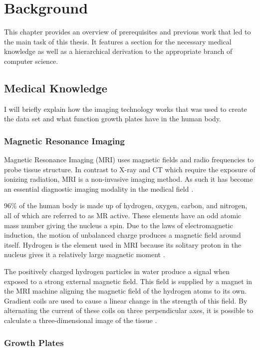 \section{Background}

This chapter provides an overview of prerequisites and previous work that led to the main task of this thesis. It features a section for the necessary medical knowledge as well as a hierarchical derivation to the appropriate branch of computer science.

\subsection{Medical Knowledge}

I will briefly explain how the imaging technology works that was used to create the data set and what function growth plates have in the human body.

\subsubsection{Magnetic Resonance Imaging}

Magnetic Resonance Imaging (MRI) uses magnetic fields and radio frequencies to probe tissue structure. In contrast to X-ray and CT which require the exposure of ionizing radiation, MRI is a non-invasive imaging method. As such it has become an essential diagnostic imaging modality in the medical field \cite{Westbrook2016}.

96\% of the human body is made up of hydrogen, oxygen, carbon, and nitrogen, all of which are referred to as MR active. These elements have an odd atomic mass number giving the nucleus a spin. Due to the laws of electromagnetic induction, the motion of unbalanced charge produces a magnetic field around itself. Hydrogen is the element used in MRI because its solitary proton in the nucleus gives it a relatively large magnetic moment \cite{Westbrook2016}. 

The positively charged hydrogen particles in water produce a signal when exposed to a strong external magnetic field. This field is supplied by a magnet in the MRI machine aligning the magnetic field of the hydrogen atoms to its own. Gradient coils are used to cause a linear change in the strength of this field. By alternating the current of these coils on three perpendicular axes, it is possible to calculate a three-dimensional image of the tissue \cite{Westbrook2016}.

\subsubsection{Growth Plates}

